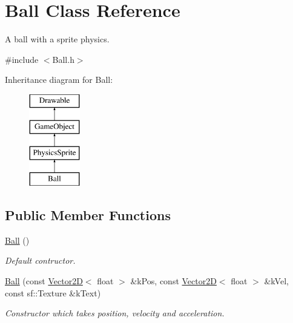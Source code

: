 \hypertarget{class_ball}{\section{Ball Class Reference}
\label{class_ball}
}


A ball with a sprite physics.  




{\ttfamily \#include $<$Ball.\+h$>$}

Inheritance diagram for Ball\+:\begin{figure}[H]
\begin{center}
\leavevmode
\includegraphics[height=4.000000cm]{class_ball}
\end{center}
\end{figure}
\subsection*{Public Member Functions}
\begin{DoxyCompactItemize}
\item 
\hypertarget{class_ball_a86a144d3dad6c953e422e32435923bbb}{\hyperlink{class_ball_a86a144d3dad6c953e422e32435923bbb}{Ball} ()}\label{class_ball_a86a144d3dad6c953e422e32435923bbb}

\begin{DoxyCompactList}\small\item\em Default contructor. \end{DoxyCompactList}\item 
\hyperlink{class_ball_a201d0014f0c644d3d3db54423925dd98}{Ball} (const \hyperlink{class_vector2_d}{Vector2\+D}$<$ float $>$ \&k\+Pos, const \hyperlink{class_vector2_d}{Vector2\+D}$<$ float $>$ \&k\+Vel, const sf\+::\+Texture \&k\+Text)
\begin{DoxyCompactList}\small\item\em Constructor which takes position, velocity and acceleration. \end{DoxyCompactList}\end{DoxyCompactItemize}
